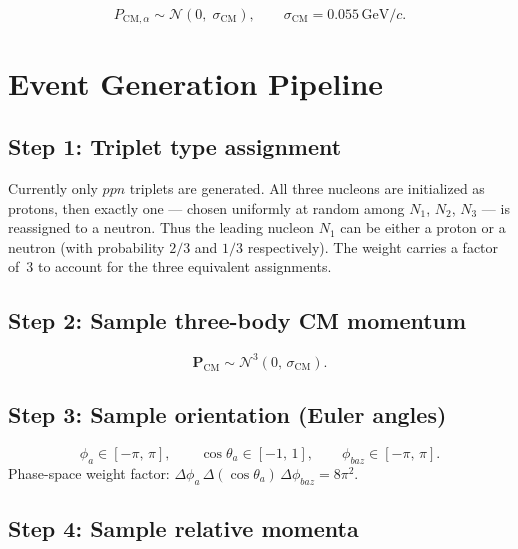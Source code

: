 \documentclass[11pt,a4paper]{article}
\newcommand{\vect}[1]{\bm{#1}}
\newcommand{\unit}[1]{\,\mathrm{#1}}
\newcommand{\GeV}{\unit{GeV}}
\begin{document}
\begin{equation}
  P_{\text{CM},\alpha} \sim \mathcal{N}(0,\;\sigma_{\text{CM}}),
  \qquad
  \sigma_{\text{CM}} = 0.055\GeV/c.
\end{equation}

\section{Event Generation Pipeline}

\subsection{Step 1: Triplet type assignment}

Currently only $ppn$ triplets are generated.  All three nucleons are
initialized as protons, then exactly one --- chosen uniformly at random
among $N_{1}$, $N_{2}$, $N_{3}$ --- is reassigned to a neutron.  Thus
the leading nucleon $N_{1}$ can be either a proton or a neutron (with
probability $2/3$ and $1/3$ respectively).  The weight carries a factor
of~3 to account for the three equivalent assignments.

\subsection{Step 2: Sample three-body CM momentum}

\begin{equation}
  \vect{P}_{\text{CM}} \sim \mathcal{N}^{3}(0,\,\sigma_{\text{CM}}).
\end{equation}

\subsection{Step 3: Sample orientation (Euler angles)}

\begin{equation}
  \phi_{a} \in [-\pi,\,\pi], \qquad
  \cos\theta_{a} \in [-1,\,1], \qquad
  \phi_{baz} \in [-\pi,\,\pi].
\end{equation}
Phase-space weight factor: $\Delta\phi_{a}\,\Delta(\cos\theta_{a})\,\Delta\phi_{baz} = 8\pi^{2}$.

\subsection{Step 4: Sample relative momenta}
\end{document}

